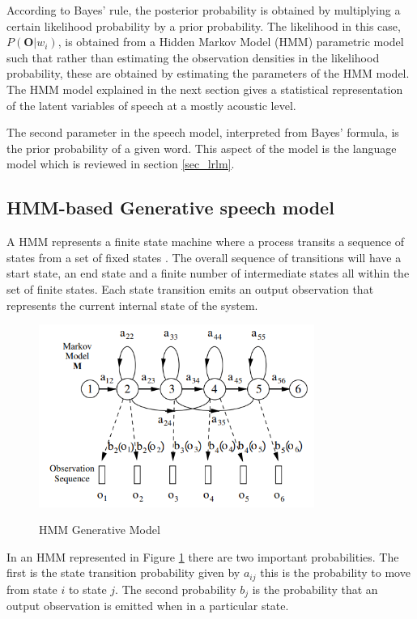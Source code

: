 According to Bayes’ rule, the posterior probability is obtained by multiplying a certain likelihood probability by a prior probability.  The likelihood in this case, $P(\mathbf{O}|w_i)$, is obtained from a Hidden Markov Model (HMM) parametric model such that rather than estimating the observation densities in the likelihood probability, these are obtained by estimating the parameters of the HMM model.  The HMM model explained in the next section gives a statistical representation of the latent variables of speech at a mostly acoustic level.

The second parameter in the speech model, interpreted from Bayes' formula, is the prior probability of a given word.  This aspect of the model is the language model which is reviewed in section \ref{sec_lrlm}.

\subsection{HMM-based Generative speech model}
A HMM represents a finite state machine where a process transits a sequence of states from a set of fixed states \citep{gales2008application, young2002htk}. The overall sequence of transitions will have a start state, an end state and a finite number of intermediate states all within the set of finite states.  Each state transition emits an output observation that represents the current internal state of the system.

\begin{figure}
\centering
  \includegraphics[width=9cm]{thesis/images/hmm}\\
  \caption{HMM Generative Model}\cite{young2002htk}\label{fig_2_1_hmm}
\end{figure}

In an HMM represented in Figure \ref{fig_2_1_hmm} there are two important probabilities.  The first is the state transition probability given by $a_{ij}$ this is the probability to move from state $i$ to state $j$.  The second probability $b_j$ is the probability that an output observation is emitted when in a particular state.


